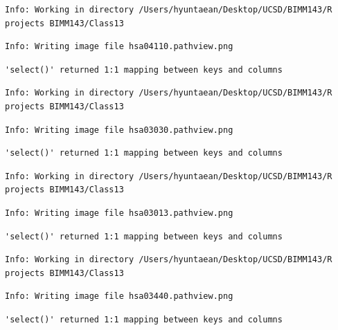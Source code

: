 \documentclass[
  letterpaper,
  DIV=11,
  numbers=noendperiod]{scrartcl}
\begin{document}
\begin{verbatim}
Info: Working in directory /Users/hyuntaean/Desktop/UCSD/BIMM143/R projects BIMM143/Class13
\end{verbatim}

\begin{verbatim}
Info: Writing image file hsa04110.pathview.png
\end{verbatim}

\begin{verbatim}
'select()' returned 1:1 mapping between keys and columns
\end{verbatim}

\begin{verbatim}
Info: Working in directory /Users/hyuntaean/Desktop/UCSD/BIMM143/R projects BIMM143/Class13
\end{verbatim}

\begin{verbatim}
Info: Writing image file hsa03030.pathview.png
\end{verbatim}

\begin{verbatim}
'select()' returned 1:1 mapping between keys and columns
\end{verbatim}

\begin{verbatim}
Info: Working in directory /Users/hyuntaean/Desktop/UCSD/BIMM143/R projects BIMM143/Class13
\end{verbatim}

\begin{verbatim}
Info: Writing image file hsa03013.pathview.png
\end{verbatim}

\begin{verbatim}
'select()' returned 1:1 mapping between keys and columns
\end{verbatim}

\begin{verbatim}
Info: Working in directory /Users/hyuntaean/Desktop/UCSD/BIMM143/R projects BIMM143/Class13
\end{verbatim}

\begin{verbatim}
Info: Writing image file hsa03440.pathview.png
\end{verbatim}

\begin{verbatim}
'select()' returned 1:1 mapping between keys and columns
\end{verbatim}
\end{document}
